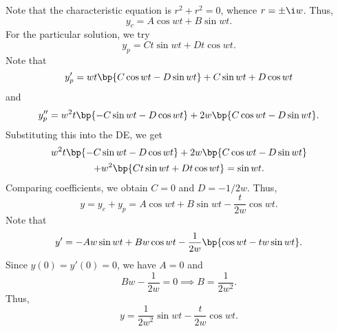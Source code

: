 \begin{solution}
\begin{ppart}
\begin{psubpart}
            \begin{figure}[H]
                \centering
            \end{figure}
        \end{psubpart}
    \end{ppart}
    \begin{ppart}
        Note that the characteristic equation is $r^2 + r^2 = 0$, whence $r = \pm \i w$. Thus, \[y_c = A\cos wt + B\sin wt.\] For the particular solution, we try \[y_p = Ct\sin wt + Dt \cos wt.\] Note that \[y_p' = wt \bp{C\cos wt - D \sin wt} + C\sin wt + D \cos wt\] and \[y_p'' = w^2 t \bp{-C\sin wt - D \cos wt} + 2w \bp{C \cos wt - D \sin wt}.\] Substituting this into the DE, we get
        \begin{gather*}
            w^2 t \bp{-C\sin wt - D \cos wt} + 2w \bp{C \cos wt - D \sin wt} \\
            + w^2 \bp{Ct\sin wt + Dt \cos wt} = \sin wt.
        \end{gather*}
        Comparing coefficients, we obtain $C = 0$ and $D = -1/2w$. Thus, \[y = y_c + y_p = A\cos wt + B \sin wt - \frac{t}{2w} \cos wt.\] Note that \[y' = -Aw \sin wt + Bw \cos wt - \frac1{2w} \bp{\cos wt - tw\sin wt}.\] Since $y(0) = y'(0) = 0$, we have $A = 0$ and \[Bw - \frac1{2w} = 0 \implies B = \frac1{2w^2}.\] Thus, \[y = \frac1{2w^2} \sin wt - \frac{t}{2w} \cos wt.\]
    \end{ppart}
\end{solution}